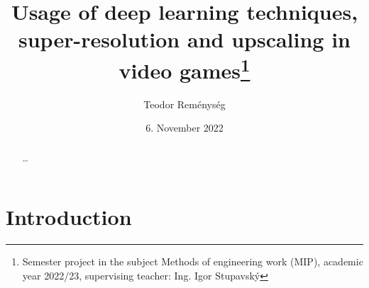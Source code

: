 \documentclass[10pt,twoside,slovak,a4paper]{article}
\title{Usage of deep learning techniques, super-resolution and upscaling in video games\thanks{Semester project in the subject Methods of engineering work (MIP), academic year 2022/23, supervising teacher: Ing. Igor Stupavský}}
\author{Teodor Reménység}\\[2pt]
\date{\small 6. November 2022}
\begin{document}
\maketitle

\begin{abstract}
\ldots
\end{abstract}



\section{Introduction}
\end{document}
